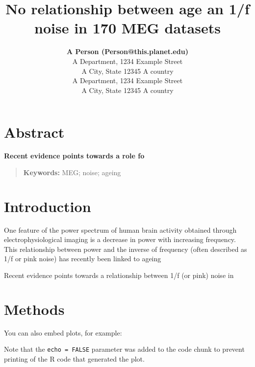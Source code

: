 \documentclass[10pt,letterpaper]{article}
\title{No relationship between age an 1/f noise in 170 MEG datasets}
\author{{\large \bf A Person (Person@this.planet.edu)} \\
  A Department, 1234 Example Street\\
A City, State 12345 A country
  \AND {\large \bf Another Person (AnotherPerson@this.planet.edu)} \\
  A Department, 1234 Example Street\\
A City, State 12345 A country}
\begin{document}
\maketitle


\section{Abstract}
{
\bf
Recent evidence points towards a role fo
}
\begin{quote}
\small
\textbf{Keywords:} 
MEG; noise; ageing
\end{quote}

\section{Introduction}\label{introduction}

One feature of the power spectrum of human brain activity obtained
through electrophysiological imaging is a decrease in power with
increasing frequency. This relationship between power and the inverse of
frequency (often described as 1/f or pink noise) has recently been
linked to ageing

Recent evidence points towards a relationship between 1/f (or pink)
noise in \citep{voytek_age-related_2015}

\section{Methods}\label{methods}

You can also embed plots, for example:

Note that the \texttt{echo\ =\ FALSE} parameter was added to the code
chunk to prevent printing of the R code that generated the plot.
\end{document}
